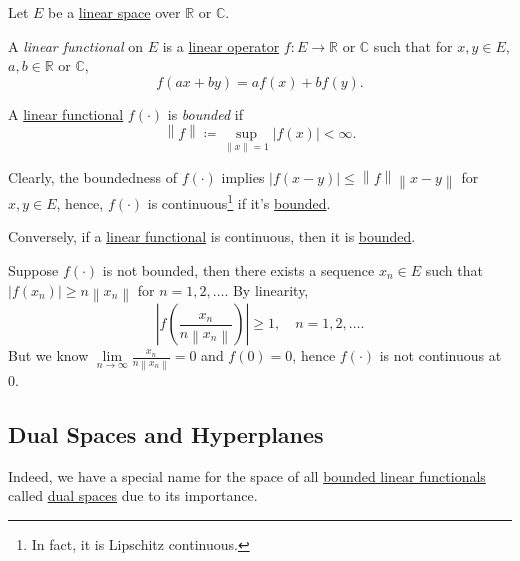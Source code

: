\begin{definition*}
	Let \(E\) be a \hyperref[def:linear-vector-space]{linear space} over \(\mathbb{R} \) or \(\mathbb{C} \).
	\begin{definition}\label{def:linear-functional}
		A \emph{linear functional} on \(E\) is a \hyperref[def:linear-op]{linear operator} \(f\colon E\to \mathbb{R} \) or \(\mathbb{C} \) such that for \(x, y\in E\), \(a, b\in \mathbb{R} \) or \(\mathbb{C} \),
		\[
			f(ax + by) = af(x) + bf(y).
		\]
	\end{definition}
	\begin{definition}\label{def:bounded-linear-functional}
		A \hyperref[def:linear-functional]{linear functional} \(f(\cdot)\) is \emph{bounded} if
		\[
			\left\lVert f\right\rVert \coloneqq \sup _{\left\lVert x\right\rVert = 1}\left\vert f(x) \right\vert  < \infty.
		\]
	\end{definition}
\end{definition*}

Clearly, the boundedness of \(f(\cdot)\) implies \(\left\vert f(x-y) \right\vert \leq \left\lVert f\right\rVert \left\lVert x-y\right\rVert \) for \(x, y\in E\), hence, \(f(\cdot)\) is continuous\footnote{In fact, it is Lipschitz continuous.} if it's \hyperref[def:bounded-linear-functional]{bounded}.

\begin{remark}
	Conversely, if a \hyperref[def:linear-functional]{linear functional} is continuous, then it is \hyperref[def:bounded-linear-functional]{bounded}.
\end{remark}
\begin{explanation}
	Suppose \(f(\cdot)\) is not bounded, then there exists a sequence \(x_n\in E\) such that \(\left\vert f(x_n) \right\vert \geq n \left\lVert x_n\right\rVert \) for \(n = 1, 2, \dots  \). By linearity,
	\[
		\left\vert f \left( \frac{x_{n} }{n \left\lVert x_{n} \right\rVert } \right) \right\vert \geq 1, \quad n = 1, 2, \dots.
	\]
	But we know \(\lim\limits_{n \to \infty} \frac{x_{n} }{n \left\lVert x_{n} \right\rVert }=0\) and \(f(0) = 0\), hence \(f(\cdot)\) is not continuous at \(0\).
\end{explanation}

\subsection{Dual Spaces and Hyperplanes}
Indeed, we have a special name for the space of all \hyperref[def:bounded-linear-functional]{bounded linear functionals} called \hyperref[def:dual-space]{dual spaces} due to its importance.

